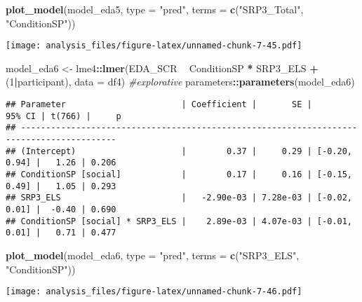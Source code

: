 \documentclass[
]{article}
\newenvironment{Shaded}{\begin{snugshade}}{\end{snugshade}}
\newcommand{\CommentTok}[1]{\textcolor[rgb]{0.56,0.35,0.01}{\textit{#1}}}
\newcommand{\DataTypeTok}[1]{\textcolor[rgb]{0.13,0.29,0.53}{#1}}
\newcommand{\DecValTok}[1]{\textcolor[rgb]{0.00,0.00,0.81}{#1}}
\newcommand{\KeywordTok}[1]{\textcolor[rgb]{0.13,0.29,0.53}{\textbf{#1}}}
\newcommand{\NormalTok}[1]{#1}
\newcommand{\OperatorTok}[1]{\textcolor[rgb]{0.81,0.36,0.00}{\textbf{#1}}}
\newcommand{\StringTok}[1]{\textcolor[rgb]{0.31,0.60,0.02}{#1}}
\begin{document}
\begin{Shaded}
\begin{Highlighting}[]
\KeywordTok{plot_model}\NormalTok{(model_eda5, }\DataTypeTok{type =} \StringTok{"pred"}\NormalTok{, }\DataTypeTok{terms =} \KeywordTok{c}\NormalTok{(}\StringTok{"SRP3_Total"}\NormalTok{, }\StringTok{"ConditionSP"}\NormalTok{))}
\end{Highlighting}
\end{Shaded}

\texttt{[image: analysis\_files/figure-latex/unnamed-chunk-7-45.pdf]}

\begin{Shaded}
\begin{Highlighting}[]
\NormalTok{model_eda6 <-}\StringTok{ }\NormalTok{lme4}\OperatorTok{::}\KeywordTok{lmer}\NormalTok{(EDA_SCR }\OperatorTok{~}\StringTok{ }\NormalTok{ConditionSP }\OperatorTok{*}\StringTok{ }\NormalTok{SRP3_ELS }\OperatorTok{+}\StringTok{ }\NormalTok{(}\DecValTok{1}\OperatorTok{|}\NormalTok{participant), }\DataTypeTok{data =}\NormalTok{ df4)  }\CommentTok{#explorative}
\NormalTok{parameters}\OperatorTok{::}\KeywordTok{parameters}\NormalTok{(model_eda6)}
\end{Highlighting}
\end{Shaded}

\begin{verbatim}
## Parameter                       | Coefficient |       SE |        95% CI | t(766) |     p
## -----------------------------------------------------------------------------------------
## (Intercept)                     |        0.37 |     0.29 | [-0.20, 0.94] |   1.26 | 0.206
## ConditionSP [social]            |        0.17 |     0.16 | [-0.15, 0.49] |   1.05 | 0.293
## SRP3_ELS                        |   -2.90e-03 | 7.28e-03 | [-0.02, 0.01] |  -0.40 | 0.690
## ConditionSP [social] * SRP3_ELS |    2.89e-03 | 4.07e-03 | [-0.01, 0.01] |   0.71 | 0.477
\end{verbatim}

\begin{Shaded}
\begin{Highlighting}[]
\KeywordTok{plot_model}\NormalTok{(model_eda6, }\DataTypeTok{type =} \StringTok{"pred"}\NormalTok{, }\DataTypeTok{terms =} \KeywordTok{c}\NormalTok{(}\StringTok{"SRP3_ELS"}\NormalTok{, }\StringTok{"ConditionSP"}\NormalTok{))}
\end{Highlighting}
\end{Shaded}

\texttt{[image: analysis\_files/figure-latex/unnamed-chunk-7-46.pdf]}
\end{document}
